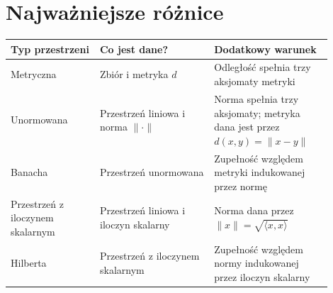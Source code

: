 \documentclass{article}
\begin{document}
\section{Najważniejsze różnice}
\begin{center}
\begin{tabular}{|p{0.25\linewidth}|p{0.32\linewidth}|p{0.33\linewidth}|}
\hline
\textbf{Typ przestrzeni} & \textbf{Co jest dane?} & \textbf{Dodatkowy warunek} \\
\hline
Metryczna & Zbiór i metryka $d$ & Odległość spełnia trzy aksjomaty metryki \\
\hline
Unormowana & Przestrzeń liniowa i norma $\|\cdot\|$ & Norma spełnia trzy aksjomaty; metryka dana jest przez $d(x,y)=\|x-y\|$ \\
\hline
Banacha & Przestrzeń unormowana & Zupełność względem metryki indukowanej przez normę \\
\hline
Przestrzeń z iloczynem skalarnym & Przestrzeń liniowa i iloczyn skalarny & Norma dana przez $\|x\|=\sqrt{\langle x,x\rangle}$ \\
\hline
Hilberta & Przestrzeń z iloczynem skalarnym & Zupełność względem normy indukowanej przez iloczyn skalarny \\
\hline
\end{tabular}
\end{center}
\end{document}
